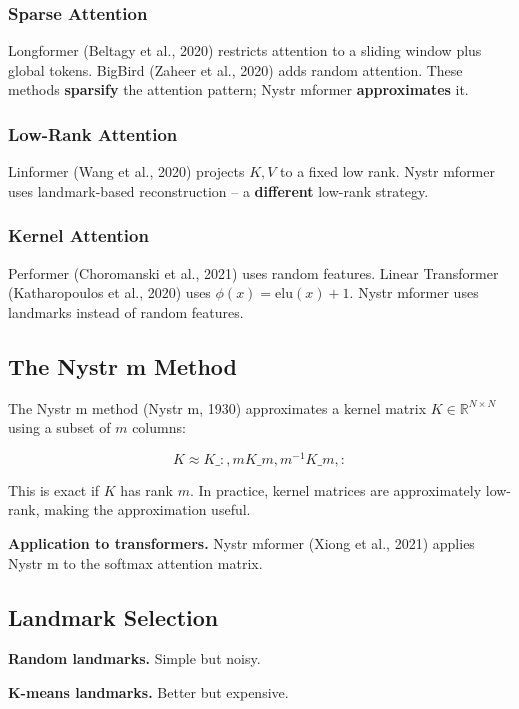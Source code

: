 \subsubsection{Sparse Attention}

Longformer (Beltagy et al., 2020) restricts attention to a sliding window 
plus global tokens. BigBird (Zaheer et al., 2020) adds random attention. 
These methods \textbf{sparsify} the attention pattern; Nystr mformer 
\textbf{approximates} it.

\subsubsection{Low-Rank Attention}

Linformer (Wang et al., 2020) projects $K, V$ to a fixed low rank. Nystr mformer 
uses landmark-based reconstruction -- a \textbf{different} low-rank strategy.

\subsubsection{Kernel Attention}

Performer (Choromanski et al., 2021) uses random features. Linear Transformer 
(Katharopoulos et al., 2020) uses $\phi(x) = \mathrm{elu}(x) + 1$. Nystr mformer 
uses landmarks instead of random features.

\subsection{The Nystr m Method}

The Nystr m method (Nystr m, 1930) approximates a kernel matrix $K \in \mathbb{R}^{N \times N}$ 
using a subset of $m$ columns:

\[
K \approx K\_{:, m} K\_{m, m}^{-1} K\_{m, :}
\tag{2.1}
\]

This is exact if $K$ has rank $m$. In practice, kernel matrices are 
approximately low-rank, making the approximation useful.

\textbf{Application to transformers.} Nystr mformer (Xiong et al., 2021) applies 
Nystr m to the softmax attention matrix.

\subsection{Landmark Selection}

\textbf{Random landmarks.} Simple but noisy.

\textbf{K-means landmarks.} Better but expensive.

